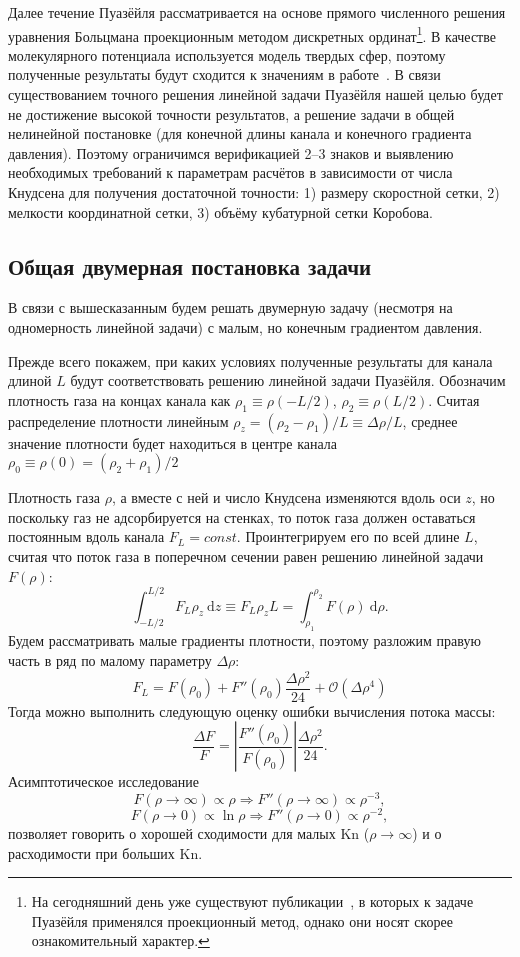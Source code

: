 \documentclass[english,russian,a4paper,12pt]{article}
\newcommand{\dd}{\:\mathrm{d}}
\newcommand{\Kn}{\mathrm{Kn}}
\begin{document}
Далее течение Пуазёйля рассматривается на основе прямого численного решения уравнения Больцмана
проекционным методом дискретных ординат\footnote
{
	На сегодняшний день уже существуют публикации~\cite{Aristov2009}, в которых к задаче Пуазёйля применялся проекционный метод,
	однако они носят скорее ознакомительный характер.
}.
В качестве молекулярного потенциала используется модель твердых сфер,
поэтому полученные результаты будут сходится к значениям в работе~\cite{Ohwada1989b}.
В связи существованием точного решения линейной задачи Пуазёйля нашей целью будет не достижение высокой точности результатов,
а решение задачи в общей нелинейной постановке (для конечной длины канала и конечного градиента давления).
Поэтому ограничимся верификацией 2--3 знаков и выявлению необходимых требований к параметрам расчётов
в зависимости от числа Кнудсена для получения достаточной точности:
1) размеру скоростной сетки, 2) мелкости координатной сетки, 3) объёму кубатурной сетки Коробова.

\subsection{Общая двумерная постановка задачи}

В связи с вышесказанным будем решать двумерную задачу (несмотря на одномерность линейной задачи)
с малым, но конечным градиентом давления.

Прежде всего покажем, при каких условиях полученные результаты для канала длиной \(L\)
будут соответствовать решению линейной задачи Пуазёйля.
Обозначим плотность газа на концах канала как \(\rho_1\equiv\rho(-L/2)\), \(\rho_2\equiv\rho(L/2)\).
Считая распределение плотности линейным \(\rho_z = (\rho_2-\rho_1)/L \equiv \Delta\rho/L\),
среднее значение плотности будет находиться в центре канала \(\rho_0\equiv\rho(0) = (\rho_2+\rho_1)/2\)

Плотность газа \(\rho\), а вместе с ней и число Кнудсена изменяются вдоль оси \(z\),
но поскольку газ не адсорбируется на стенках, то поток газа должен оставаться постоянным вдоль канала \(F_L=const\).
Проинтегрируем его по всей длине \(L\), считая что поток газа в поперечном сечении равен решению линейной задачи \(F(\rho)\):
\[ \int_{-L/2}^{L/2}F_L\rho_z\dd z \equiv F_L\rho_zL = \int_{\rho_1}^{\rho_2} F(\rho)\dd\rho. \]
Будем рассматривать малые градиенты плотности, поэтому разложим правую часть в ряд по малому параметру \(\Delta\rho\):
\[ F_L = F(\rho_0) + F''(\rho_0) \frac{\Delta\rho^2}{24} + \mathcal{O}(\Delta\rho^4) \]
Тогда можно выполнить следующую оценку ошибки вычисления потока массы:
\[ \frac{\Delta F}{F} = \left|\frac{F''(\rho_0)}{F(\rho_0)}\right|\frac{\Delta\rho^2}{24}. \]
Асимптотическое исследование
\[ F(\rho\rightarrow\infty) \propto \rho \Rightarrow F''(\rho\rightarrow\infty) \propto \rho^{-3}, \]
\[ F(\rho\rightarrow0) \propto \ln\rho \Rightarrow F''(\rho\rightarrow0) \propto \rho^{-2}, \]
позволяет говорить о хорошей сходимости для малых \(\Kn\) (\(\rho\rightarrow\infty\)) и о расходимости при больших \(\Kn\).
\end{document}
